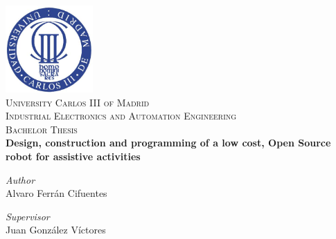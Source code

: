 \begin{titlepage}

\begin{center}


\includegraphics[width=0.25\textwidth]{images/uc3m.jpg}\\[2cm]    
\textsc{\huge University Carlos III of Madrid}\\[0.5cm]
\textsc{\Large Industrial Electronics and Automation Engineering}\\[0.5cm]
\textsc{\large Bachelor Thesis}\\[3cm]

{\huge \bfseries{Design, construction and programming of a low cost, Open Source robot for assistive activities}\\[8cm]}


 
\end{center}

\begin{minipage}{0.55\textwidth}
\begin{flushleft} \large
\emph{Author}\\
Alvaro Ferrán Cifuentes\\

\end{flushleft}
\end{minipage}
\begin{minipage}{0.4\textwidth}
\begin{flushright} \large
\emph{Supervisor}\\
Juan González Víctores

\end{flushright}\end{minipage}\vfill

\vfill
















\end{titlepage}